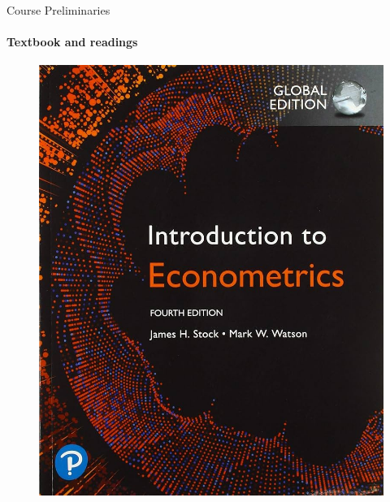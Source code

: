 \documentclass[11pt,english]{beamer}
\begin{document}
\begin{frame}{Course Preliminaries}
	\framesubtitle{Textbook and readings}

	\begin{figure}
		\begin{minipage}{0.45\textwidth}
			\centering
			\includegraphics[width=\textwidth]{book_stockwatson.jpg}
		\end{minipage}
		\hfill
		\begin{minipage}{0.45\textwidth}
			\centering

\end{minipage}
\end{figure}
\end{frame}
\end{document}
